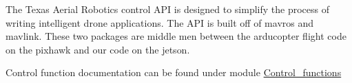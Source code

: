 The Texas Aerial Robotics control A\+PI is designed to simplify the process of writing intelligent drone applications. The A\+PI is built off of mavros and mavlink. These two packages are middle men between the arducopter flight code on the pixhawk and our code on the jetson.

Control function documentation can be found under module \mbox{\hyperlink{group__control__functions}{Control\+\_\+functions}} 
